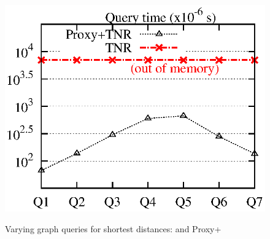 \begin{figure}[t!]
\begin{center}
{\includegraphics[scale=0.45]{./exp/query_cus_dist_tnr.eps}}
\end{center}
\vspace{1ex}
\caption{Varying graph queries  for shortest distances: \tnr and Proxy+\tnr}
\label{fig:performance_dist_queries_tnr}
\vspace{-1ex}
\end{figure}

